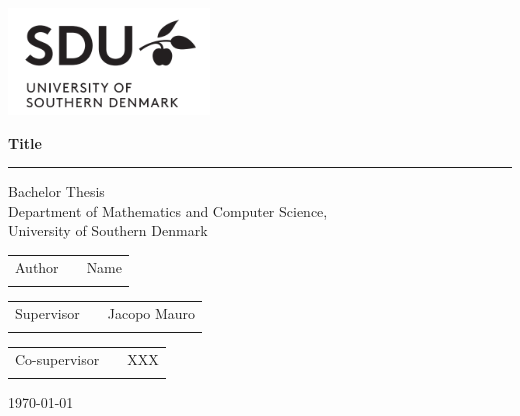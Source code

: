 \begin{titlepage}
    \Large
    \includegraphics[width=0.4\textwidth]{imgs/logo.png}
    \renewcommand{\thepage}{Title}
    \thispagestyle{empty}
       \begin{center}
           \vspace*{1cm}
    \linespread{1.25}
           {\doublespacing \Huge\textbf{Title}}
    \linespread{1}
           \rule{\linewidth}{1pt}
           {\huge Bachelor Thesis \\
           \Large Department of Mathematics and Computer Science, \\
           University of Southern Denmark}
    \end{center}
    \vspace{5cm}
    \Large
    \begin{tabularx}{\textwidth}{lXr}
    Author & & Name \\ \\
    \end{tabularx}
    \begin{tabularx}{\textwidth}{lXr}
    Supervisor & & Jacopo Mauro\\ \\
    \end{tabularx}
    \begin{tabularx}{\textwidth}{lXr}
    Co-supervisor & & XXX \\ \\
    \end{tabularx}
    
    \vfill
    \large \today
    \end{titlepage}